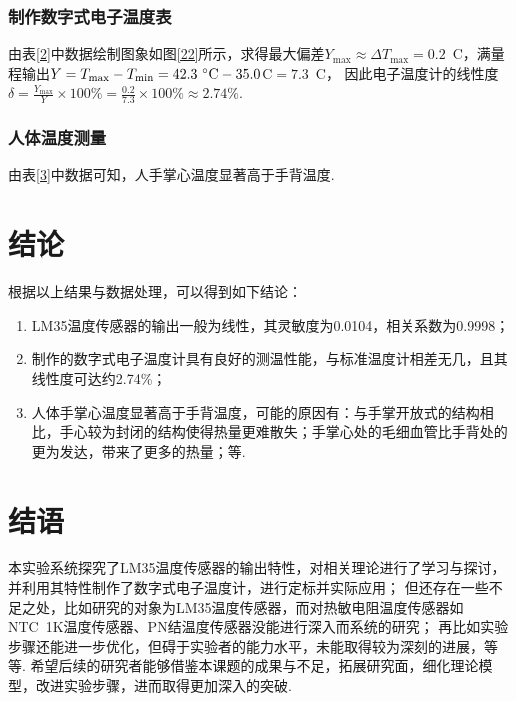 \documentclass[a4paper,12pt]{article}%
\begin{document}
\subsubsection{制作数字式电子温度表}
\begin{spacing}{1.528}%
    由表\ref{2}中数据绘制图象如图\ref{22}所示，求得最大偏差$Y_{\max} \approx \Delta T_{\max}=0.2$~\degree C，满量程输出$Y=T_{\max}-T_{\min}=42.3\text{~\degree C}-35.0$\degree C$=7.3$~\degree C，
    因此电子温度计的线性度$\delta=\frac{Y_{\max}}{Y}\times 100\%=\frac{0.2}{7.3}\times 100\%\approx2.74\%$.
\end{spacing}

\subsubsection{人体温度测量}
\begin{spacing}{1.528}%
    由表\ref{3}中数据可知，人手掌心温度显著高于手背温度.
\end{spacing}

\section{结论}
\begin{spacing}{1.528}%
    根据以上结果与数据处理，可以得到如下结论：
    \begin{enumerate}
        \item LM35温度传感器的输出一般为线性，其灵敏度为0.0104，相关系数为0.9998；
        \item 制作的数字式电子温度计具有良好的测温性能，与标准温度计相差无几，且其线性度可达约2.74\%；
        \item 人体手掌心温度显著高于手背温度，可能的原因有：与手掌开放式的结构相比，手心较为封闭的结构使得热量更难散失；手掌心处的毛细血管比手背处的更为发达，带来了更多的热量；等.
    \end{enumerate}
\end{spacing}

\section{结语}
\begin{spacing}{1.528}%
    本实验系统探究了LM35温度传感器的输出特性，对相关理论进行了学习与探讨，并利用其特性制作了数字式电子温度计，进行定标并实际应用；
    但还存在一些不足之处，比如研究的对象为LM35温度传感器，而对热敏电阻温度传感器如NTC~1K温度传感器、PN结温度传感器没能进行深入而系统的研究；
    再比如实验步骤还能进一步优化，但碍于实验者的能力水平，未能取得较为深刻的进展，等等. 
    希望后续的研究者能够借鉴本课题的成果与不足，拓展研究面，细化理论模型，改进实验步骤，进而取得更加深入的突破. 
\end{spacing}
\end{document}
